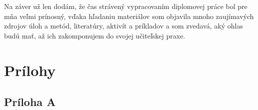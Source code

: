 Na záver už len dodám, že čas strávený vypracovaním diplomovej práce bol pre mňa veľmi prínosný, vďaka hľadaniu materiálov som objavila mnoho zaujímavých zdrojov úloh a metód, literatúry, aktivít a príkladov a som zvedavá, aký ohlas budú mať, až ich zakomponujem do svojej učiteľskej praxe.

\renewcommand{\bibname}{Zoznam použitej literatúry}
\HlavickaLiteratura
\label{chap:bib}
\printbibliography

\chapter*{Prílohy}
\label{chap:pril}

\section*{Príloha A}
